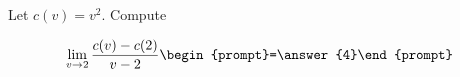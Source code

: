 \documentclass{ximera}
\author{Bart Snapp}
\begin{document}
\begin{exercise}
Let $c(v) = v^2$. Compute

\[
\lim_{ v\to 2 } 
\frac{c(v)-c(2)}{v-2} \begin{prompt}=\answer{4}\end{prompt}
\]
\end{exercise}
\end{document}

